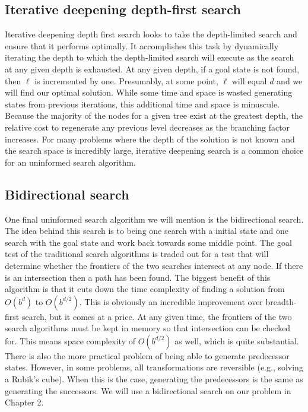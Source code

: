\documentclass[a4paper,11pt]{report}
\begin{document}
\subsection{Iterative deepening depth-first search}
Iterative deepening depth first search looks to take the depth-limited search
and ensure that it performs optimally. It accomplishes this task by dynamically
iterating the depth to which the depth-limited search will execute as the
search at any given depth is exhausted. At any given depth, if a goal state
is not found, then $\ell$ is incremented by one.  Presumably, at some point,
$\ell$ will equal $d$ and we will find our optimal solution.\cite{norvig} While
some time and space is wasted generating states from previous iterations, this
additional time and space is minuscule.  Because the majority of the nodes for
a given tree exist at the greatest depth, the relative cost to regenerate any
previous level decreases as the branching factor increases.\cite{norvig} For
many problems where the depth of the solution is not known and the search space
is incredibly large, iterative deepening search is a common choice for an
uninformed search algorithm.\cite{norvig}

\subsection{Bidirectional search}
One final uninformed search algorithm we will mention is the bidirectional
search.  The idea behind this search is to being one search with a initial
state and one search with the goal state and work back towards some middle
point.  The goal test of the traditional search algorithms is traded out for a
test that will determine whether the frontiers of the two searches intersect at
any node.  If there is an intersection then a path has been found.\cite{norvig}
The biggest benefit of this algorithm is that it cuts down the time complexity
of finding a solution from $O(b^d)$ to $O(b^{d / 2})$.  This is obviously an
incredible improvement over breadth-first search, but it comes at a price.  At
any given time, the frontiers of the two search algorithms must be kept in
memory so that intersection can be checked for.  This means space complexity of
$O(b^{d / 2})$ as well, which is quite substantial. There is also the more
practical problem of being able to generate predecessor states.  However, in
some problems, all transformations are reversible (e.g., solving a Rubik's
cube).  When this is the case, generating the predecessors is the same as
generating the successors.\cite{norvig} We will use a bidirectional search on
our problem in Chapter 2.
\end{document}
